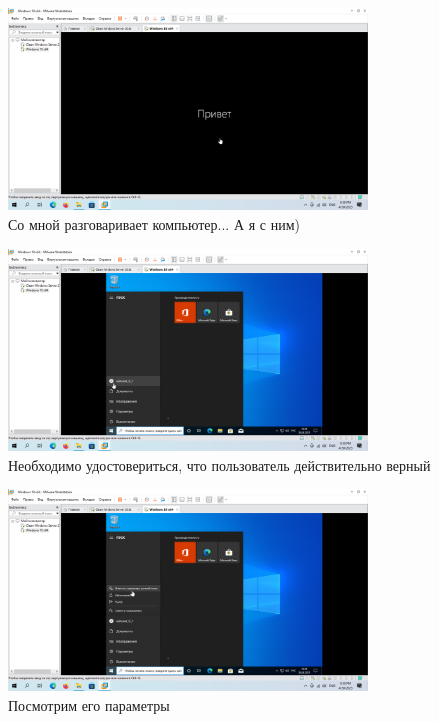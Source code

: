 \documentclass[a4paper]{article}
\begin{document}
  \begin{figure}[H]
    \centering
    \includegraphics[width=0.85\textwidth]{Screenshot_115}
    \caption{Со мной разговаривает компьютер... А я с ним)}
    \label{img:115}
  \end{figure}

  \begin{figure}[H]
    \centering
    \includegraphics[width=0.85\textwidth]{Screenshot_116}
    \caption{Необходимо удостовериться, что пользователь действительно верный}
    \label{img:116}
  \end{figure}

  \begin{figure}[H]
    \centering
    \includegraphics[width=0.85\textwidth]{Screenshot_117}
    \caption{Посмотрим его параметры}
    \label{img:117}
  \end{figure}
\end{document}
